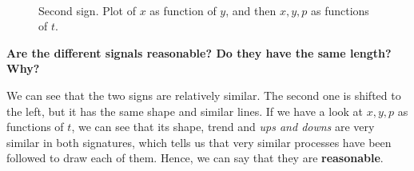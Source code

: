 \documentclass[a4paper]{article}
\begin{document}
{\begin{figure}[H]
  \centering
  \qquad
  \\
  \qquad%
  \caption{Second sign. Plot of $x$ as function of $y$, and then $x,y,p$ as functions of $t$.}
  \label{fig:four:signals:2}
\end{figure}



\textbf{ Are the different signals reasonable? Do they have the same length? Why?}

We can see that the two signs are relatively similar. The second one is shifted to the left, but it has the same shape and similar lines. If we have a look at $x,y,p$ as functions of $t$, we can see that its shape, trend and \emph{ups and downs} are very similar in both signatures, which tells us that very similar processes have been followed to draw each of them. Hence, we can say that they are \textbf{reasonable}.\\

}
\end{document}
